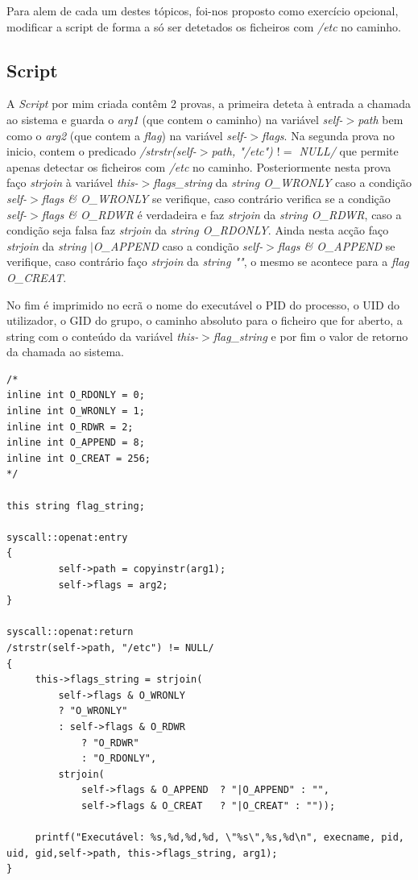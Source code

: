 \documentclass[conference,compsoc]{IEEEtran}
\begin{document}
Para alem de cada um destes tópicos, foi-nos proposto como exercício opcional, modificar a script de forma a só ser detetados os ficheiros com \textit{/etc} no caminho. 

\subsection{Script}
A \textit{Script} por mim criada contêm 2 provas, a primeira deteta à entrada a chamada ao sistema e guarda o \textit{arg1} (que contem o caminho) na variável \textit{self-$>$path} bem como o \textit{arg2} (que contem a \textit{flag}) na variável \textit{self-$>$flags}. Na segunda prova no inicio, contem o predicado \textit{/strstr(self-$>$path, "/etc") $!=$ NULL/} que permite apenas detectar os ficheiros com \textit{/etc} no caminho. Posteriormente nesta prova faço \textit{strjoin} à variável \textit{this-$>$flags\_string} da \textit{string O\_WRONLY} caso a condição \textit{self-$>$flags \& O\_WRONLY} se verifique, caso contrário verifica se a condição \textit{self-$>$flags \& O\_RDWR} é verdadeira e faz \textit{strjoin} da \textit{string O\_RDWR}, caso a condição seja falsa faz \textit{strjoin} da \textit{string O\_RDONLY}. Ainda nesta acção faço \textit{strjoin} da \textit{string $|$O\_APPEND} caso a condição \textit{self-$>$flags \& O\_APPEND} se verifique, caso contrário faço \textit{strjoin} da \textit{string ""}, o mesmo se acontece para a \textit{flag O\_CREAT}.

No fim é imprimido no ecrã o nome do executável o PID do processo, o UID do utilizador, o GID do grupo, o caminho absoluto para o ficheiro que for aberto, a string com o conteúdo da variável \textit{this-$>$flag\_string} e por fim o valor de retorno da chamada ao sistema.

\begin{lstlisting}
/*
inline int O_RDONLY = 0;
inline int O_WRONLY = 1;
inline int O_RDWR = 2;
inline int O_APPEND = 8;
inline int O_CREAT = 256;
*/

this string flag_string;

syscall::openat:entry
{
         self->path = copyinstr(arg1);
         self->flags = arg2;
}

syscall::openat:return 
/strstr(self->path, "/etc") != NULL/
{
     this->flags_string = strjoin(
         self->flags & O_WRONLY
         ? "O_WRONLY"
         : self->flags & O_RDWR
             ? "O_RDWR"
             : "O_RDONLY",
         strjoin(
             self->flags & O_APPEND  ? "|O_APPEND" : "",
             self->flags & O_CREAT   ? "|O_CREAT" : ""));
 
     printf("Executável: %s,%d,%d,%d, \"%s\",%s,%d\n", execname, pid, uid, gid,self->path, this->flags_string, arg1);
}
\end{lstlisting}
\end{document}
